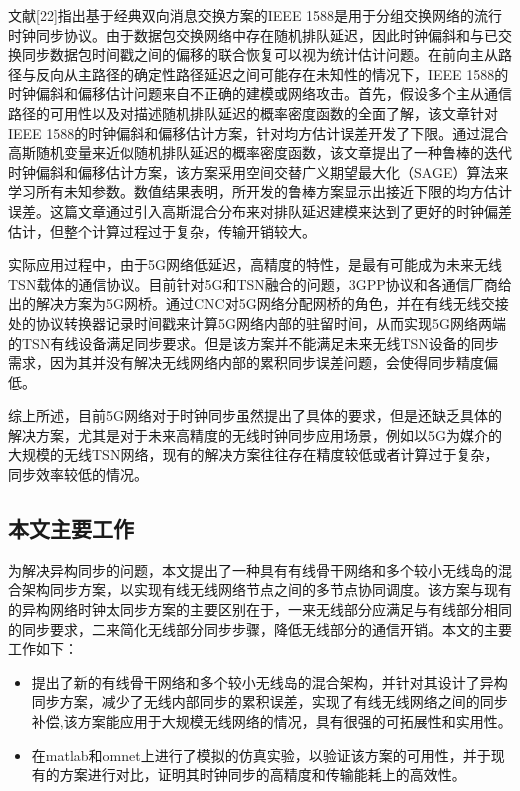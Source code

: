 \documentclass[UTF8,a4paper,12pt]{ctexart}
\numberwithin{equation}{section}
\begin{document}
文献[22]指出基于经典双向消息交换方案的IEEE 1588是用于分组交换网络的流行时钟同步协议。由于数据包交换网络中存在随机排队延迟，因此时钟偏斜和与已交换同步数据包时间戳之间的偏移的联合恢复可以视为统计估计问题。在前向主从路径与反向从主路径的确定性路径延迟之间可能存在未知性的情况下，IEEE 1588的时钟偏斜和偏移估计问题来自不正确的建模或网络攻击。首先，假设多个主从通信路径的可用性以及对描述随机排队延迟的概率密度函数的全面了解，该文章针对IEEE 1588的时钟偏斜和偏移估计方案，针对均方估计误差开发了下限。通过混合高斯随机变量来近似随机排队延迟的概率密度函数，该文章提出了一种鲁棒的迭代时钟偏斜和偏移估计方案，该方案采用空间交替广义期望最大化（SAGE）算法来学习所有未知参数。数值结果表明，所开发的鲁棒方案显示出接近下限的均方估计误差。这篇文章通过引入高斯混合分布来对排队延迟建模来达到了更好的时钟偏差估计，但整个计算过程过于复杂，传输开销较大。


实际应用过程中，由于5G网络低延迟，高精度的特性，是最有可能成为未来无线TSN载体的通信协议。目前针对5G和TSN融合的问题，3GPP协议和各通信厂商给出的解决方案为5G网桥。通过CNC对5G网络分配网桥的角色，并在有线无线交接处的协议转换器记录时间戳来计算5G网络内部的驻留时间，从而实现5G网络两端的TSN有线设备满足同步要求。但是该方案并不能满足未来无线TSN设备的同步需求，因为其并没有解决无线网络内部的累积同步误差问题，会使得同步精度偏低。


综上所述，目前5G网络对于时钟同步虽然提出了具体的要求，但是还缺乏具体的解决方案，尤其是对于未来高精度的无线时钟同步应用场景，例如以5G为媒介的大规模的无线TSN网络，现有的解决方案往往存在精度较低或者计算过于复杂，同步效率较低的情况。

\subsection{本文主要工作}
为解决异构同步的问题，本文提出了一种具有有线骨干网络和多个较小无线岛的混合架构同步方案，以实现有线无线网络节点之间的多节点协同调度。该方案与现有的异构网络时钟太同步方案的主要区别在于，一来无线部分应满足与有线部分相同的同步要求，二来简化无线部分同步步骤，降低无线部分的通信开销。本文的主要工作如下：
\begin{itemize}
	\item 提出了新的有线骨干网络和多个较小无线岛的混合架构，并针对其设计了异构同步方案，减少了无线内部同步的累积误差，实现了有线无线网络之间的同步补偿,该方案能应用于大规模无线网络的情况，具有很强的可拓展性和实用性。
	\item 在matlab和omnet上进行了模拟的仿真实验，以验证该方案的可用性，并于现有的方案进行对比，证明其时钟同步的高精度和传输能耗上的高效性。
\end{itemize}
\end{document}
